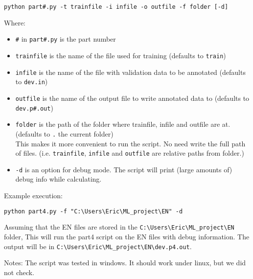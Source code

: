\documentclass[12pt]{article}
\begin{document}
\begin{verbatim}
python part#.py -t trainfile -i infile -o outfile -f folder [-d]
\end{verbatim}
Where:
\begin{itemize}
\item \texttt{\#} in \texttt{part\#.py} is the part number
\item \texttt{trainfile} is the name of the file used for training (defaults to \texttt{train})
\item \texttt{infile} is the name of the file with validation data to be annotated (defaults to \texttt{dev.in})
\item \texttt{outfile} is the name of the output file to write annotated data to (defaults to \texttt{dev.p\#.out})
\item \texttt{folder} is the path of the folder where trainfile, infile and outfile are at. (defaults to \texttt{.} the current folder) \\
This makes it more convenient to run the script. No need write the full path of files. (i.e. \texttt{trainfile}, \texttt{infile} and \texttt{outfile} are relative paths from folder.)
\item \texttt{-d} is an option for debug mode. The script will print (large amounts of) debug info while calculating.
\end{itemize}

Example execution:
\begin{verbatim}
python part4.py -f "C:\Users\Eric\ML_project\EN" -d
\end{verbatim}
Assuming that the EN files are stored in the \verb|C:\Users\Eric\ML_project\EN| folder, This will run the part4 script on the EN files with debug information. The output will be in \verb|C:\Users\Eric\ML_project\EN\dev.p4.out|.

Notes: The script was tested in windows. It should work under linux, but we did not check.
\end{document}

